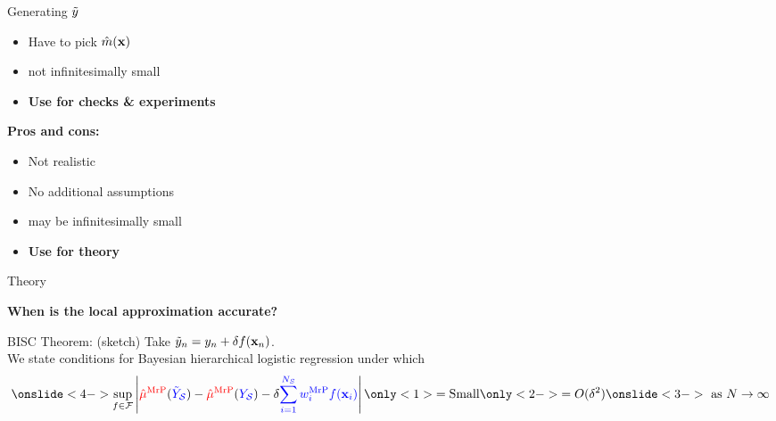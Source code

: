 \begin{frame}[t]{Generating $\tilde{y}$}
{{\begin{itemize}
    \item Have to pick $\hat{m}(\mathbf{x})$
    \item \surcol{$\Ytil - \Ysur$} not infinitesimally small
    \item \textbf{Use for checks \& experiments}
    \end{itemize}
    }
    {
\textbf{Pros and cons:}
    \begin{itemize}
    \item Not realistic
    \item No additional assumptions
    \item \surcol{$\Ytil - \Ysur$} may be infinitesimally small
    \item \textbf{Use for theory}
    \end{itemize}
    }
}



\end{frame}


\begin{frame}[c]{Theory}

\textbf{When is the local approximation accurate?}

\begin{block}{BISC Theorem: (sketch)}
    Take $\tilde{y}_n = y_n + \delta f(\mathbf{x}_n)$.\\[1em]
    We state conditions for Bayesian hierarchical logistic regression under which
$$
\onslide<4->{\sup_{f \in \mathcal{F}}}
\abs{
    \muhatmrp[\Ytil] - \muhatmrp
    - \delta \surcol{\sumsur \w_i^\mrp \f(\x_i)}
}
\only<1>{ = \textrm{Small}}
\only<2->{ = O(\delta^2)}
\onslide<3->{\textrm{ as }N \rightarrow \infty}
$$
\end{block}




\end{frame}
